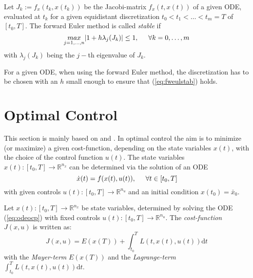 \documentclass[a4paper, 12pt]{scrreprt} %
\begin{document}
\begin{definition}
Let $J_k := f_x(t_k,x(t_k))$ be the Jacobi-matrix $f_x(t,x(t))$ of a given \ac{ODE}, evaluated at $t_k$ for a given equidistant discretization $t_0 < t_1 < \dots < t_m = T$ of $[t_0,T]$. The forward Euler method is called \emph{stable} if
\begin{equation}
\underset{j=1,\dots,n}{max} \vert 1+h\lambda_j(J_k) \vert \leq 1 ,\hspace{0.5cm} \forall k=0,\dots,m
\label{eq:fweulstab}
\end{equation}
with $\lambda_j(J_k)$ being the $j-$th eigenvalue of $J_k$.
\end{definition}

For a given \ac{ODE}, when using the forward Euler method, the discretization has to be chosen with an $h$ small enough to ensure that (\ref{eq:fweulstab}) holds.

\section{Optimal Control}
\label{sec:oc}
This section is mainly based on \cite{ocatcov} and \cite{os}. In optimal control the aim is to minimize (or maximize) a given cost-function, depending on the state variables $x(t)$, with the choice of the control function $u(t)$.
The state variables $x(t): [t_0,T] \to \mathbb{R}^{n_x}$ can be determined via the solution of an \ac{ODE}
\begin{equation}
\dot x(t) = f(x(t),u(t)), \hspace{0.5cm} \forall t \in [t_0, T]
\label{eq:odeocp}
\end{equation} 
with given controls $u(t): [t_0,T] \to \mathbb{R}^{n_u}$ and an initial condition $x(t_0) = \bar x_0$. 


\begin{definition}
Let $x(t):[t_0,T]\to \mathbb R^{n_x}$ be state variables, determined by solving the \ac{ODE} (\ref{eq:odeocp}) with fixed controls $u(t): [t_0,T] \to \mathbb{R}^{n_u}$. 
The \emph{cost-function} $J(x,u)$ is written as:
\begin{equation}
J(x,u) = E(x(T)) + \int_{t_0}^T L(t,x(t),u(t)) \mathrm{d}t
\label{eq:costfunc}
\end{equation}
with the \emph{Mayer-term} $E(x(T))$ and the \emph{Lagrange-term} $\int_{t_0}^T L(t,x(t),u(t)) \mathrm{d}t$.
\end{definition}
\end{document}
